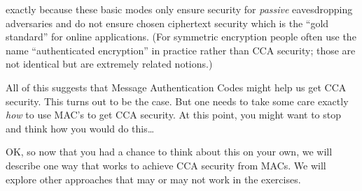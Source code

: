 exactly because these basic modes only ensure security for
\emph{passive} eavesdropping adversaries and do not ensure chosen
ciphertext security which is the ``gold standard'' for online
applications. (For symmetric encryption people often use the name
``authenticated encryption'' in practice rather than CCA security; those
are not identical but are extremely related notions.)

All of this suggests that Message Authentication Codes might help us get
CCA security. This turns out to be the case. But one needs to take some
care exactly \emph{how} to use MAC's to get CCA security. At this point,
you might want to stop and think how you would do this\ldots{}


\newpage


\newpage

OK, so now that you had a chance to think about this on your own, we
will describe one way that works to achieve CCA security from MACs. We
will explore other approaches that may or may not work in the exercises.

\hypertarget{CCAfromCPAMACthm}{}

